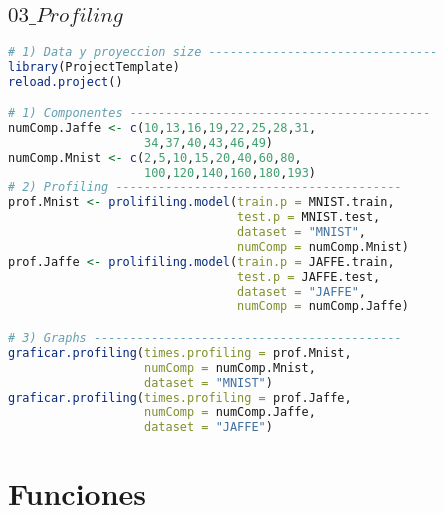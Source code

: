 \subsection{$03\_Profiling$}
\begin{lstlisting}[language=R, basicstyle=\small]
# 1) Data y proyeccion size --------------------------------
library(ProjectTemplate)
reload.project()

# 1) Componentes ------------------------------------------
numComp.Jaffe <- c(10,13,16,19,22,25,28,31,
                   34,37,40,43,46,49) 
numComp.Mnist <- c(2,5,10,15,20,40,60,80,
                   100,120,140,160,180,193)
# 2) Profiling ----------------------------------------
prof.Mnist <- prolifiling.model(train.p = MNIST.train, 
                                test.p = MNIST.test,
                                dataset = "MNIST",
                                numComp = numComp.Mnist)
prof.Jaffe <- prolifiling.model(train.p = JAFFE.train, 
                                test.p = JAFFE.test,
                                dataset = "JAFFE",
                                numComp = numComp.Jaffe)

# 3) Graphs -------------------------------------------
graficar.profiling(times.profiling = prof.Mnist, 
                   numComp = numComp.Mnist, 
                   dataset = "MNIST")
graficar.profiling(times.profiling = prof.Jaffe, 
                   numComp = numComp.Jaffe, 
                   dataset = "JAFFE")
\end{lstlisting}

\section{Funciones}
